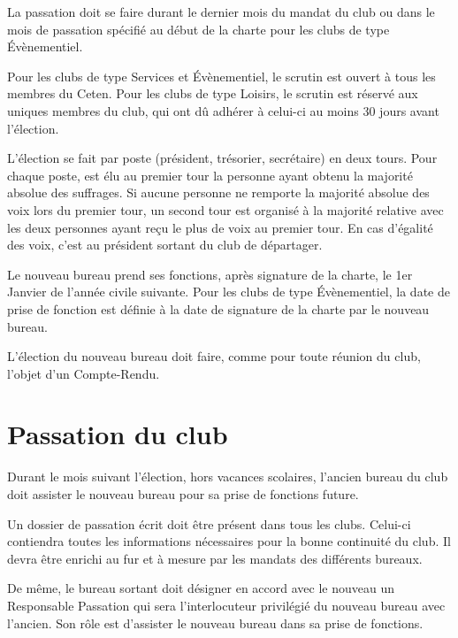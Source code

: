 \documentclass{article}
\begin{document}
\begin{multicols}{2}
{			La passation doit se faire durant le dernier mois du mandat
			du club ou dans le mois de passation spécifié au début de la
			charte pour les clubs de type Évènementiel.

			Pour les clubs de type Services et Évènementiel, le scrutin
			est ouvert à tous les membres du Ceten. Pour les clubs de
			type Loisirs, le scrutin est réservé aux uniques membres du
			club, qui ont dû adhérer à celui-ci au moins 30 jours avant
			l’élection.

			L’élection se fait par poste (président, trésorier, secrétaire)
			en deux tours. Pour chaque poste, est élu au premier tour la
			personne ayant obtenu la majorité absolue des suffrages. Si
			aucune personne ne remporte la majorité absolue des voix
			lors du premier tour, un second tour est organisé à la
			majorité relative avec les deux personnes ayant reçu le plus
			de voix au premier tour. En cas d’égalité des voix, c’est au
			président sortant du club de départager.

			Le nouveau bureau prend ses fonctions, après signature de
			la charte, le 1er Janvier de l’année civile suivante. Pour les
			clubs de type Évènementiel, la date de prise de fonction est
			définie à la date de signature de la charte par le nouveau
			bureau.

			L’élection du nouveau bureau doit faire, comme pour toute
			réunion du club, l’objet d’un Compte-Rendu.

		}
		
		\section{Passation du club}

		{\small

			Durant le mois suivant l’élection, hors vacances scolaires,
			l’ancien bureau du club doit assister le nouveau bureau pour
			sa prise de fonctions future.

			Un dossier de passation écrit doit être présent dans tous les
			clubs. Celui-ci contiendra toutes les informations
			nécessaires pour la bonne continuité du club. Il devra être
			enrichi au fur et à mesure par les mandats des différents
			bureaux.

			De même, le bureau sortant doit désigner en accord avec le
			nouveau un Responsable Passation qui sera l’interlocuteur
			privilégié du nouveau bureau avec l’ancien. Son rôle est
			d’assister le nouveau bureau dans sa prise de fonctions.

}
\end{multicols}
\end{document}
